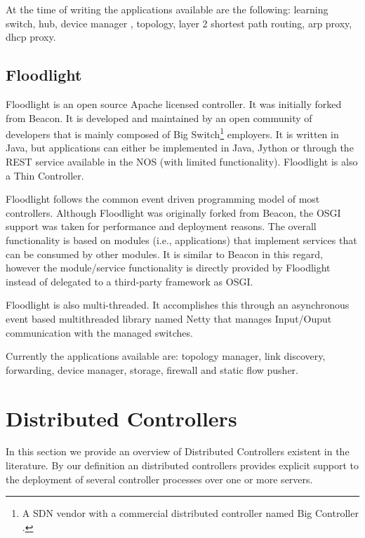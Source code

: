\begin{itemize}
At the time of writing the applications available are the following: 
 learning switch, hub, device manager , topology, layer 2
shortest path routing, arp  proxy, dhcp proxy. 


\subsection{Floodlight}
Floodlight is an open source Apache licensed controller. It was
initially forked from Beacon. It  is developed and maintained by an open community of developers that is mainly composed of Big Switch\footnote{A SDN vendor with a commercial
distributed controller named Big Controller \cite{:vn}.} employers. It is written in Java, but applications can either be
implemented in Java, Jython or through the REST service
available in the NOS (with limited functionality). Floodlight is also a Thin Controller. 

Floodlight follows the common event driven
programming model of most  controllers. Although Floodlight was originally
forked from Beacon, the OSGI support was taken for performance and
deployment reasons. The overall functionality is based on modules
(i.e., applications) that implement services that can be consumed by
other modules. It is similar to Beacon in this regard, however the
module/service functionality is directly provided by Floodlight
instead of delegated to a third-party framework as OSGI. 

Floodlight is also multi-threaded. It accomplishes this through an
asynchronous event based multithreaded library named Netty \cite{netty} that manages Input/Ouput communication with the managed
switches. 

Currently the applications available are: topology manager,  link
discovery, forwarding, device manager, storage, firewall and
static flow pusher.  


\section{Distributed Controllers}
\glsresetall
\label{sec:relatedWork:distributed}

In this section we provide an overview of Distributed Controllers
existent in the literature. By our definition an distributed
controllers provides explicit support to the deployment of several
controller processes over one or more servers. 


\end{itemize}
